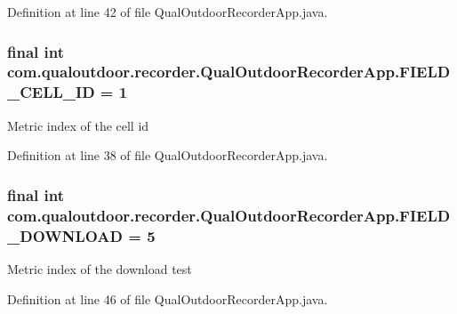 Definition at line 42 of file Qual\-Outdoor\-Recorder\-App.\-java.

\hypertarget{classcom_1_1qualoutdoor_1_1recorder_1_1QualOutdoorRecorderApp_abe439853b2cd271963db8b6f2a1c4891}{
\subsubsection[{F\-I\-E\-L\-D\-\_\-\-C\-E\-L\-L\-\_\-\-I\-D}]{\setlength{\rightskip}{0pt plus 5cm}final int com.\-qualoutdoor.\-recorder.\-Qual\-Outdoor\-Recorder\-App.\-F\-I\-E\-L\-D\-\_\-\-C\-E\-L\-L\-\_\-\-I\-D = 1\hspace{0.3cm}{\ttfamily [static]}}}\label{classcom_1_1qualoutdoor_1_1recorder_1_1QualOutdoorRecorderApp_abe439853b2cd271963db8b6f2a1c4891}
Metric index of the cell id 

Definition at line 38 of file Qual\-Outdoor\-Recorder\-App.\-java.

\hypertarget{classcom_1_1qualoutdoor_1_1recorder_1_1QualOutdoorRecorderApp_a276550e7468a714c591dcba65ec4b772}{
\subsubsection[{F\-I\-E\-L\-D\-\_\-\-D\-O\-W\-N\-L\-O\-A\-D}]{\setlength{\rightskip}{0pt plus 5cm}final int com.\-qualoutdoor.\-recorder.\-Qual\-Outdoor\-Recorder\-App.\-F\-I\-E\-L\-D\-\_\-\-D\-O\-W\-N\-L\-O\-A\-D = 5\hspace{0.3cm}{\ttfamily [static]}}}\label{classcom_1_1qualoutdoor_1_1recorder_1_1QualOutdoorRecorderApp_a276550e7468a714c591dcba65ec4b772}
Metric index of the download test 

Definition at line 46 of file Qual\-Outdoor\-Recorder\-App.\-java.

